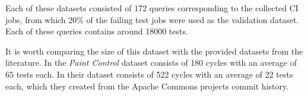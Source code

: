 Each of these datasets consisted of 172 queries corresponding to the collected CI jobs, from which 20\% 
of the failing test jobs were used as the validation dataset. Each of these queries
contains around 18000 tests.

It is worth comparing the size of this dataset with the provided datasets from the literature.
In \cite{DBLP:journals/corr/abs-1811-04122} the \emph{Paint Control} dataset consists of 180 cycles
with an average of 65 tests each.  In \cite{Bertolino2020LearningtoRankVR} their dataset consists 
of 522 cycles with an average of 22 tests each, which they created from the Apache Commons projects 
commit history.
